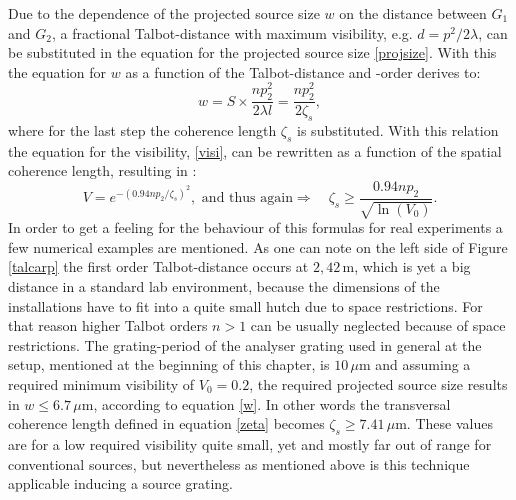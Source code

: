 Due to the dependence of the projected source size $w$ on the distance between $G_{1}$ and $G_{2}$, a fractional Talbot-distance with maximum visibility, e.g. $d = p^{2}/2\lambda$, can be substituted in the equation for the projected source size \ref{projsize}. With this the equation for $w$ as a function of the Talbot-distance and -order derives to:
\begin{equation}
w = S\times \frac{np_{2}^{2}}{2 \lambda l} = \frac{np_{2}^{2}}{2 \zeta_{s}},  
\end{equation}
where for the last step the coherence length $\zeta_{s}$ is substituted. With this relation the equation for the visibility, \ref{visi}, can be rewritten as a function of the spatial coherence length, resulting in \citep{WeitkampPfeiffer2006}:  
\begin{equation}\label{zeta}
V = e^{-(0.94 n p_{2}/ \zeta_{s})^{2}}, \text{ and thus again} \Rightarrow \quad \zeta_{s} \geq \frac{0.94 np_{2}}{\sqrt{\ln(V_{0})}}. 
\end{equation}
In order to get a feeling for the behaviour of this formulas for real experiments a few numerical examples are mentioned. As one can note on the left side of Figure \ref{talcarp} the first order Talbot-distance occurs at $2,42\, $m, which is yet a big distance in a standard lab environment, because the dimensions of the installations have to fit into a quite small hutch due to space restrictions. For that reason higher Talbot orders $n > 1$ can be usually neglected because of space restrictions. The grating-period of the analyser grating used in general at the setup, mentioned at the beginning of this chapter, is $10\, \mu$m and assuming a required minimum visibility of $V_{0}= 0.2$, the required projected source size results in $w \leq 6.7\, \mu$m, according to equation \ref{w}. In other words the transversal coherence length defined in equation \ref{zeta} becomes $\zeta_{s} \geq 7.41\, \mu$m. These values are for a low required visibility quite small, yet and mostly far out of range for conventional sources, but nevertheless as mentioned above is this technique applicable inducing a source grating.\\

